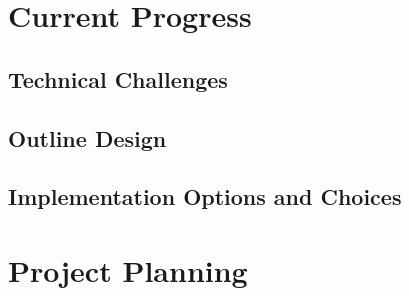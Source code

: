\documentclass[11pt,fleqn,twoside]{article}
\begin{document}
\section{Current Progress}

\subsection{Technical Challenges}


\subsection{Outline Design}

\subsection{Implementation Options and Choices}

\section{Project Planning}
\end{document}

